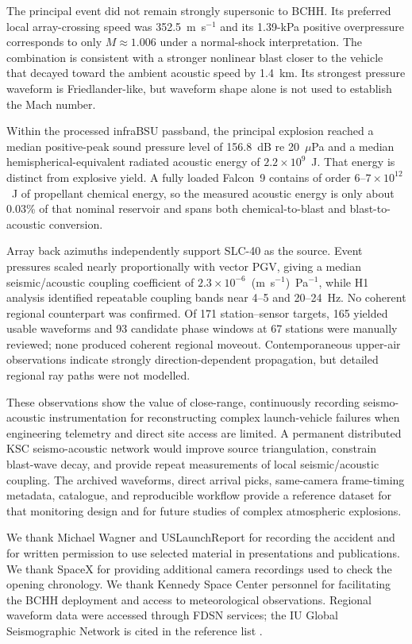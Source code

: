 \documentclass[]{seismica}
\begin{document}
The principal event did not remain strongly supersonic to BCHH. Its preferred
local array-crossing speed was 352.5~m~s$^{-1}$ and its 1.39-kPa positive
overpressure corresponds to only $M\approx1.006$ under a normal-shock
interpretation. The combination is consistent with a stronger nonlinear blast
closer to the vehicle that decayed toward the ambient acoustic speed by
1.4~km. Its strongest pressure waveform is Friedlander-like, but waveform
shape alone is not used to establish the Mach number.

Within the processed infraBSU passband, the principal explosion reached a
median positive-peak sound pressure level of 156.8~dB re 20~$\mu$Pa and a
median hemispherical-equivalent radiated acoustic energy of
$2.2\times10^9$~J. That energy is distinct from explosive yield. A fully loaded
Falcon~9 contains of order $6$--$7\times10^{12}$~J of propellant chemical
energy, so the measured acoustic energy is only about 0.03\% of that nominal
reservoir and spans both chemical-to-blast and blast-to-acoustic conversion.

Array back azimuths independently support SLC-40 as the source. Event pressures
scaled nearly proportionally with vector PGV, giving a median seismic/acoustic
coupling coefficient of $2.3\times10^{-6}$~(m~s$^{-1}$)~Pa$^{-1}$, while H1
analysis identified repeatable coupling bands near 4--5 and 20--24~Hz. No
coherent regional counterpart was confirmed. Of 171 station--sensor targets,
165 yielded usable waveforms and 93 candidate phase windows at 67 stations were
manually reviewed; none produced coherent regional moveout. Contemporaneous
upper-air observations indicate strongly direction-dependent propagation, but
detailed regional ray paths were not modelled.

These observations show the value of close-range, continuously recording
seismo-acoustic instrumentation for reconstructing complex launch-vehicle
failures when engineering telemetry and direct site access are limited. A
permanent distributed KSC seismo-acoustic network would improve source
triangulation, constrain blast-wave decay, and provide repeat measurements of
local seismic/acoustic coupling. The archived waveforms, direct arrival picks,
same-camera frame-timing metadata, catalogue, and reproducible workflow provide
a reference dataset for that monitoring design and for future studies of
complex atmospheric explosions.

\begin{acknowledgements}
We thank Michael Wagner and USLaunchReport for recording the accident and for
written permission to use selected material in presentations and publications.
We thank SpaceX for providing additional camera recordings used to check the
opening chronology.
We thank Kennedy Space Center personnel for facilitating the BCHH deployment
and access to meteorological observations. Regional waveform data were
accessed through FDSN services; the IU Global Seismographic Network is cited
in the reference list \citep{asl_gsn_iu_1988}.
\end{acknowledgements}
\end{document}
